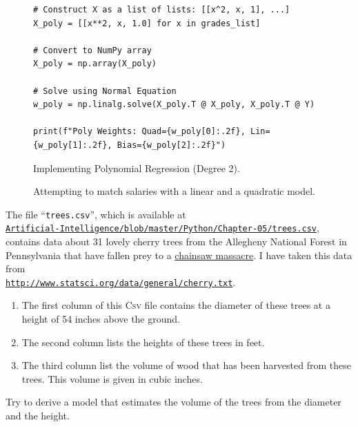 \begin{figure}[!ht]
\centering
\begin{verbatim}
# Construct X as a list of lists: [[x^2, x, 1], ...]
X_poly = [[x**2, x, 1.0] for x in grades_list]

# Convert to NumPy array
X_poly = np.array(X_poly)

# Solve using Normal Equation
w_poly = np.linalg.solve(X_poly.T @ X_poly, X_poly.T @ Y)

print(f"Poly Weights: Quad={w_poly[0]:.2f}, Lin={w_poly[1]:.2f}, Bias={w_poly[2]:.2f}")
\end{verbatim}
\caption{Implementing Polynomial Regression (Degree 2).}
\label{fig:poly_implementation}
\end{figure}


\begin{figure}[!th]
\caption{Attempting to match salaries with a linear and a quadratic model.}
\label{fig:salaries.png}
\end{figure}



\exercise
The file ``\texttt{trees.csv}'', which is available at
\\[0.2cm]
\hspace*{1.3cm}
\href{https://github.com/karlstroetmann/Artificial-Intelligence/blob/master/Python/Chapter-05/trees.csv}{\texttt{Artificial-Intelligence/blob/master/Python/Chapter-05/trees.csv}},
\\[0.2cm]
contains data about 31 lovely cherry trees from the Allegheny National Forest in Pennsylvania that have fallen
prey to a \href{https://en.wikipedia.org/wiki/The_Texas_Chain_Saw_Massacre}{chainsaw massacre}.  I have taken this data from
\\[0.2cm]
\hspace*{1.3cm}
\href{http://www.statsci.org/data/general/cherry.txt}{\texttt{http://www.statsci.org/data/general/cherry.txt}}.
\begin{enumerate}
\item The first column of this \textsc{Csv} file contains the diameter of these trees at a height of 54 inches above
      the ground.
\item The second column lists the heights of these trees in feet.
\item The third column list the volume of wood that has been harvested from these trees.  This volume is given
      in cubic inches.
\end{enumerate}
Try to derive a model that estimates the volume of the trees from the diameter and the height.
\eox


